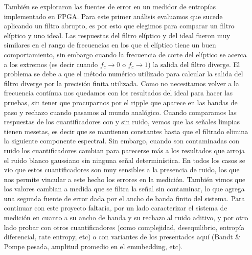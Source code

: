 También se exploraron las fuentes de error en un medidor de entropías implementado en FPGA.
Para este primer análisis evaluamos que sucede aplicando un filtro abrupto, es por esto que elegimos para comparar un filtro elíptico y uno ideal. 
Las respuestas del filtro elíptico y del ideal fueron muy similares en el rango de frecuencias en los que el elíptico tiene un buen comportamiento, sin embargo cuando la frecuencia de corte del elíptico se acerca a los extremos (es decir cuando $f_c \to 0$ o $f_c \to 1$) la salida del filtro diverge.
El problema se debe a que el método numérico utilizado para calcular la salida del filtro diverge por la precisión finita utilizada.
Como no necesitamos volver a la frecuencia contínua nos quedamos con los resultados del ideal para hacer las pruebas, sin tener que procuparnos por el ripple que aparece en las bandas de paso y rechazo cuando pasamos al mundo analógico.
Cuando comparamos las respuestas de los cuantificadores con y sin ruido, vemos que las señales limpias tienen mesetas, es decir que se mantienen constantes hasta que el filtrado elimina la siguiente componente espectral.
Sin embargo, cuando son contaminadas con ruido los cuantificadores cambian para parecerse más a los resultados que arroja el ruido blanco gaussiano sin ninguna señal determinística.
En todos los casos se vio que estos cuantificadores son muy sensibles a la presencia de ruido, los que nos permite vincular a este hecho los errores en la medición.
También vimos que los valores cambian a medida que se filtra la señal sin contaminar, lo que agrega una segunda fuente de error dada por el ancho de banda finito del sistema.
Para continuar con este proyecto faltaría, por un lado caracterizar el sistema de medición en cuanto a su ancho de banda y su rechazo al ruido aditivo, y por otro lado probar con otros cuantificadores (como complejidad, desequilibrio, entropía diferencial, rate entropy, etc) o con variantes de los presentados aquí (Bandt \& Pompe pesada, amplitud promedio en el emmbedding, etc).